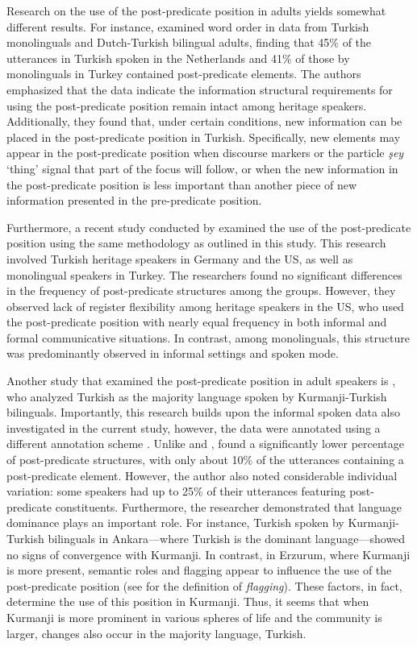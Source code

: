 Research on the use of the post-predicate position in adults yields somewhat different results. For instance, \citet{DogruozBackus2007} examined word order in data from Turkish monolinguals and Dutch-Turkish bilingual adults, finding that 45\% of the utterances in Turkish spoken in the Netherlands and 41\% of those by monolinguals in Turkey contained post-predicate elements. The authors emphasized that the data indicate the information structural requirements for using the post-predicate position remain intact among heritage speakers. Additionally, they found that, under certain conditions, new information can be placed in the post-predicate position in Turkish. Specifically, new elements may appear in the post-predicate position when discourse markers or the particle \textit{şey} ‘thing’ signal that part of the focus will follow, or when the new information in the post-predicate position is less important than another piece of new information presented in the pre-predicate position.

Furthermore, a recent study conducted by \citet{SchroederEtAl2024} examined the use of the post-predicate position using the same methodology as outlined in this study. This research involved Turkish heritage speakers in Germany and the US, as well as monolingual speakers in Turkey. The researchers found no significant differences in the frequency of post-predicate structures among the groups. However, they observed lack of register flexibility among heritage speakers in the US, who used the post-predicate position with nearly equal frequency in both informal and formal communicative situations. In contrast, among monolinguals, this structure was predominantly observed in informal settings and spoken mode.

Another study that examined the post-predicate position in adult speakers is \citet{Haig2024}, who analyzed Turkish as the majority language spoken by Kurmanji-Turkish bilinguals. Importantly, this research builds upon the informal spoken data also investigated in the current study, however, the data were annotated using a different annotation scheme \citep{Iefremenko2021}. Unlike \citet{DogruozBackus2007} and \citet{SchroederEtAl2024}, \citet{Iefremenko2021} found a significantly lower percentage of post-predicate structures, with only about 10\% of the utterances containing a post-predicate element. However, the author also noted considerable individual variation: some speakers had up to 25\% of their utterances featuring post-predicate constituents. Furthermore, the researcher demonstrated that language dominance plays an important role. For instance, Turkish spoken by Kurmanji-Turkish bilinguals in Ankara—where Turkish is the dominant language—showed no signs of convergence with Kurmanji. In contrast, in Erzurum, where Kurmanji is more present, semantic roles and flagging appear to influence the use of the post-predicate position (see  for the definition of \textit{flagging}). These factors, in fact, determine the use of this position in Kurmanji. Thus, it seems that when Kurmanji is more prominent in various spheres of life and the community is larger, changes also occur in the majority language, Turkish.

